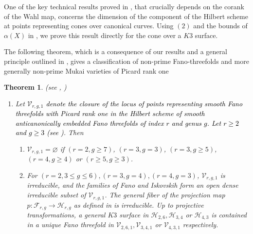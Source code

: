 \documentclass[11pt,twoside]{amsart}
\theoremstyle{plain}
\numberwithin{equation}{section}
\newtheorem{theorem}{Theorem}[section]
\theoremstyle{definition}
\begin{document}
One of the key technical results proved in \cite{CLM98}, that crucially depends on the corank of the Wahl map, concerns the dimension of the component of the Hilbert scheme at points representing cones over canonical curves. Using  $(2)$ and the bounds of $\alpha(X)$ in , we prove this result directly for the cone over a $K3$ surface. \par
The following theorem, which is a consequence of our results and a general principle outlined in \cite{CLM98}, gives a classification of non-prime Fano-threefolds and more generally non-prime Mukai varieties of Picard rank one 
 
\begin{theorem}(see , )\label{classification of mukai varieties intro}
\begin{enumerate}
    \item Let \textcolor{black}{$\mathcal{V}_{r,g,1}$ denote the closure of the locus of points representing smooth Fano threefolds with Picard rank one in the Hilbert scheme of smooth anticanonically embedded Fano threefolds of index $r$ and genus $g$. Let $r \geq 2$ and $g \geq 3$ (see )}.
    Then

\begin{enumerate}
    \item $\mathcal{V}_{r,g,1} = \varnothing$ if $(r = 2, g \geq 7)$, $(r = 3, g = 3)$, $(r = 3, g \geq 5)$, $(r = 4, g \geq 4)$ or $(r \geq 5, g \geq 3)$. 
    \item For $(r = 2, 3 \leq g \leq 6), (r = 3, g = 4), (r = 4, g = 3)$, $\mathcal{V}_{r,g,1}$ is irreducible, and the families of Fano and Iskovskih form an open dense irreducible subset of $\mathcal{V}_{r,g,1}$. The general fiber of the projection map $p: \mathcal{F}_{r,g} \to \mathcal{H}_{r,g}$ as defined in  is irreducible. Up to projective transformations, a general $K3$ surface in $\mathcal{H}_{2,6}, \mathcal{H}_{3,4}$ or $ \mathcal{H}_{4,3}$ is contained in a unique Fano threefold in $\mathcal{V}_{2,6,1}, \mathcal{V}_{3,4,1}$ or $ \mathcal{V}_{4,3,1}$ respectively.
\end{enumerate}


\end{enumerate}
\end{theorem}
\end{document}
